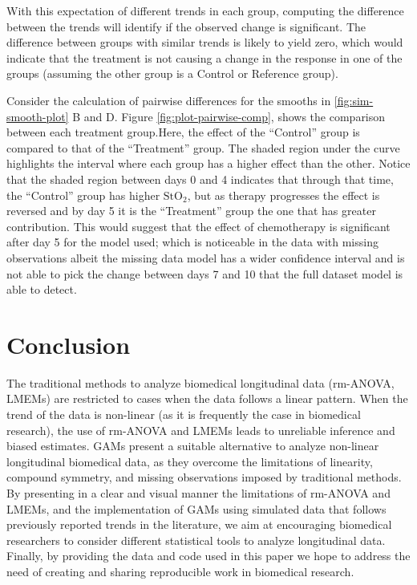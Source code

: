 \documentclass[
]{article}
\begin{document}
With this expectation of different trends in each group, computing the difference between the trends will identify if the observed change is significant. The difference between groups with similar trends is likely to yield zero, which would indicate that the treatment is not causing a change in the response in one of the groups (assuming the other group is a Control or Reference group).

Consider the calculation of pairwise differences for the smooths in \ref{fig:sim-smooth-plot} B and D. Figure \ref{fig:plot-pairwise-comp}, shows the comparison between each treatment group.Here, the effect of the ``Control'' group is compared to that of the ``Treatment'' group. The shaded region under the curve highlights the interval where each group has a higher effect than the other. Notice that the shaded region between days 0 and 4 indicates that through that time, the ``Control'' group has higher \(\mbox{StO}_2\), but as therapy progresses the effect is reversed and by day 5 it is the ``Treatment'' group the one that has greater contribution. This would suggest that the effect of chemotherapy is significant after day 5 for the model used; which is noticeable in the data with missing observations albeit the missing data model has a wider confidence interval and is not able to pick the change between days 7 and 10 that the full dataset model is able to detect.

\FloatBarrier

\hypertarget{conclusion}{%
\section{Conclusion}\label{conclusion}}

The traditional methods to analyze biomedical longitudinal data (rm-ANOVA, LMEMs) are restricted to cases when the data follows a linear pattern. When the trend of the data is non-linear (as it is frequently the case in biomedical research), the use of rm-ANOVA and LMEMs leads to unreliable inference and biased estimates. GAMs present a suitable alternative to analyze non-linear longitudinal biomedical data, as they overcome the limitations of linearity, compound symmetry, and missing observations imposed by traditional methods. By presenting in a clear and visual manner the limitations of rm-ANOVA and LMEMs, and the implementation of GAMs using simulated data that follows previously reported trends in the literature, we aim at encouraging biomedical researchers to consider different statistical tools to analyze longitudinal data. Finally, by providing the data and code used in this paper we hope to address the need of creating and sharing reproducible work in biomedical research.
\end{document}
